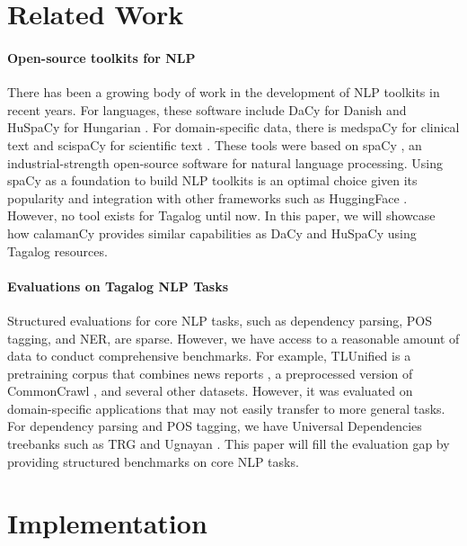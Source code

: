 \documentclass[11pt]{article}
\begin{document}



\section{Related Work}

\paragraph*{Open-source toolkits for NLP}
There has been a growing body of work in the development of NLP toolkits in recent years. 
For languages, these software include DaCy for Danish \citep{Enevoldsen2021DaCyAU} and HuSpaCy for Hungarian \citep{Orosz2022HuSpaCyAI}.
For domain-specific data, there is medspaCy for clinical text \citep{Eyre2021LaunchingIC} and scispaCy for scientific text \citep{Neumann2019ScispaCyFA}.
These tools were based on spaCy \citep{Honnibal2020Spacy}, an industrial-strength open-source software for natural language processing.
Using spaCy as a foundation to build NLP toolkits is an optimal choice given its popularity and integration with other frameworks such as HuggingFace \citep{Wolf2019HuggingFacesTS}.
However, no tool exists for Tagalog until now.
In this paper, we will showcase how calamanCy provides similar capabilities as DaCy and HuSpaCy using Tagalog resources.

\paragraph*{Evaluations on Tagalog NLP Tasks} 
Structured evaluations for core NLP tasks, such as dependency parsing, POS tagging, and NER, are sparse.
However, we have access to a reasonable amount of data to conduct comprehensive benchmarks.
For example, TLUnified \citep{Cruz2021ImprovingLL} is a pretraining corpus that combines news reports \citep{Cruz2020ExploitingNA}, a preprocessed version of CommonCrawl \citep{OrtizSuarez2019AsynchronousPF}, and several other datasets.
However, it was evaluated on domain-specific applications that may not easily transfer to more general tasks.
For dependency parsing and POS tagging, we have Universal Dependencies treebanks such as TRG \citep{Samson2018TRG} and Ugnayan \citep{Aquino2020ParsingIT}.
This paper will fill the evaluation gap by providing structured benchmarks on core NLP tasks.

\section{Implementation}
\end{document}
